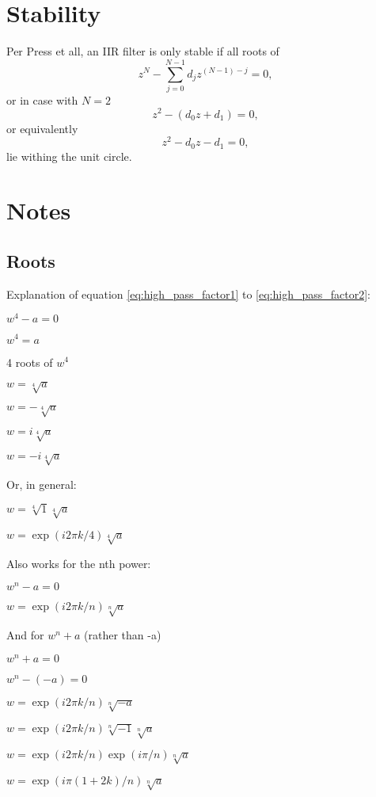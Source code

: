 \documentclass[a4paper]{article}
\begin{document}
\section{Stability}
Per Press et all, an IIR filter is only stable if all roots of
\begin{equation}
z^N - \sum^{N-1}_{j=0} d_j z^{(N-1)-j} = 0,\label{eq:stability}
\end{equation}
or in case with $N=2$
\begin{equation}
z^2 - (d_0 z + d_1) = 0,
\end{equation}
or equivalently
\begin{equation}
z^2 - d_0 z - d_1 = 0,
\end{equation}
lie withing the unit circle.

\section{Notes}
\subsection{Roots}
\label{roots}
Explanation of equation \ref{eq:high_pass_factor1} to \ref{eq:high_pass_factor2}:

$w^4 - a = 0$

$w^4 = a$

4 roots of $w^4$

$w = \sqrt[4]{a}$

$w = -\sqrt[4]{a}$

$w = i\sqrt[4]{a}$

$w = -i\sqrt[4]{a}$

Or, in general:

$w = \sqrt[4]{1}\sqrt[4]{a}$

$w = \exp(i 2 \pi k/4)\sqrt[4]{a}$

Also works for the nth power:

$w^n - a = 0$

$w = \exp(i 2 \pi k/n)\sqrt[n]{a}$

And for $w^n + a$ (rather than -a)

$w^n + a = 0$

$w^n - (-a) = 0$

$w = \exp(i 2 \pi k/n)\sqrt[n]{-a}$

$w = \exp(i 2 \pi k/n)\sqrt[n]{-1}\sqrt[n]{a}$

$w = \exp(i 2 \pi k/n)\exp(i \pi/n) \sqrt[n]{a}$

$w = \exp(i \pi (1 + 2 k)/n)\sqrt[n]{a}$
\end{document}
